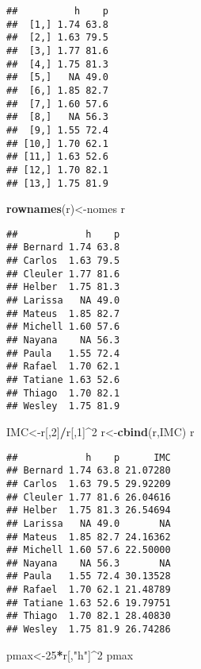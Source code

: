 \documentclass[]{article}
\newenvironment{Shaded}{\begin{snugshade}}{\end{snugshade}}
\newcommand{\KeywordTok}[1]{\textcolor[rgb]{0.13,0.29,0.53}{\textbf{#1}}}
\newcommand{\DecValTok}[1]{\textcolor[rgb]{0.00,0.00,0.81}{#1}}
\newcommand{\StringTok}[1]{\textcolor[rgb]{0.31,0.60,0.02}{#1}}
\newcommand{\OperatorTok}[1]{\textcolor[rgb]{0.81,0.36,0.00}{\textbf{#1}}}
\newcommand{\NormalTok}[1]{#1}
\begin{document}
\begin{verbatim}
##          h    p
##  [1,] 1.74 63.8
##  [2,] 1.63 79.5
##  [3,] 1.77 81.6
##  [4,] 1.75 81.3
##  [5,]   NA 49.0
##  [6,] 1.85 82.7
##  [7,] 1.60 57.6
##  [8,]   NA 56.3
##  [9,] 1.55 72.4
## [10,] 1.70 62.1
## [11,] 1.63 52.6
## [12,] 1.70 82.1
## [13,] 1.75 81.9
\end{verbatim}

\begin{Shaded}
\begin{Highlighting}[]
\KeywordTok{rownames}\NormalTok{(r)<-nomes}
\NormalTok{r}
\end{Highlighting}
\end{Shaded}

\begin{verbatim}
##            h    p
## Bernard 1.74 63.8
## Carlos  1.63 79.5
## Cleuler 1.77 81.6
## Helber  1.75 81.3
## Larissa   NA 49.0
## Mateus  1.85 82.7
## Michell 1.60 57.6
## Nayana    NA 56.3
## Paula   1.55 72.4
## Rafael  1.70 62.1
## Tatiane 1.63 52.6
## Thiago  1.70 82.1
## Wesley  1.75 81.9
\end{verbatim}

\begin{Shaded}
\begin{Highlighting}[]
\NormalTok{IMC<-r[,}\DecValTok{2}\NormalTok{]}\OperatorTok{/}\NormalTok{r[,}\DecValTok{1}\NormalTok{]}\OperatorTok{^}\DecValTok{2}
\NormalTok{r<-}\KeywordTok{cbind}\NormalTok{(r,IMC)}
\NormalTok{r}
\end{Highlighting}
\end{Shaded}

\begin{verbatim}
##            h    p      IMC
## Bernard 1.74 63.8 21.07280
## Carlos  1.63 79.5 29.92209
## Cleuler 1.77 81.6 26.04616
## Helber  1.75 81.3 26.54694
## Larissa   NA 49.0       NA
## Mateus  1.85 82.7 24.16362
## Michell 1.60 57.6 22.50000
## Nayana    NA 56.3       NA
## Paula   1.55 72.4 30.13528
## Rafael  1.70 62.1 21.48789
## Tatiane 1.63 52.6 19.79751
## Thiago  1.70 82.1 28.40830
## Wesley  1.75 81.9 26.74286
\end{verbatim}

\begin{Shaded}
\begin{Highlighting}[]
\NormalTok{pmax<-}\DecValTok{25}\OperatorTok{*}\NormalTok{r[,}\StringTok{"h"}\NormalTok{]}\OperatorTok{^}\DecValTok{2}
\NormalTok{pmax}
\end{Highlighting}
\end{Shaded}
\end{document}
